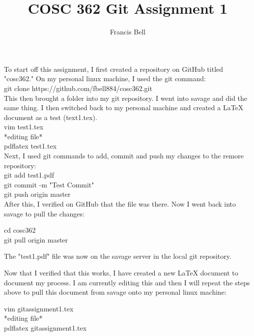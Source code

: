 \documentclass[12pt]{article}
\author{Francis Bell}
\title{COSC 362 Git Assignment 1}
\begin{document}
\maketitle

To start off this assignment, I first created a repository on GitHub titled "cosc362." On my personal linux machine, I used the git command:\\

	git clone https://github.com/fbell884/cosc362.git\\

This then brought a folder into my git repository. I went into savage and did the same thing. I then switched back to my personal machine and created a LaTeX document as a test (text1.tex). 
\\

	vim test1.tex\\

	*editing file*\\

	pdflatex test1.tex\\

Next, I used git commands to add, commit and push my changes to the remore repository:\\

	git add test1.pdf\\
	
	git commit -m "Test Commit"\\ 

	git push origin master\\

After this, I verified on GitHub that the file was there. Now I went back into savage to pull the changes: 

	cd cosc362\\

	git pull origin master

The "test1.pdf" file was now on the savage server in the local git repository. 

Now that I verified that this works, I have created a new LaTeX document to document my process. I am currently editing this and then I will repeat the steps above to pull this document from savage onto my personal linux machine:

	vim gitassignment1.tex\\
	
	*editing file*\\

	pdflatex gitassignment1.tex\\
\end{document}
